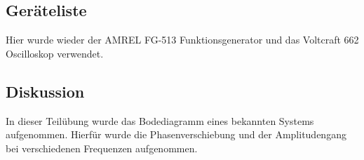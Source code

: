 \documentclass[12pt,a4paper,ngerman]{article}
\begin{document}
\subsection{Geräteliste}
Hier wurde wieder der AMREL FG-513 Funktionsgenerator und das Voltcraft 662 Oscilloskop verwendet.

\subsection{Diskussion}
In dieser Teilübung wurde das Bodediagramm eines bekannten Systems aufgenommen. Hierfür wurde die Phasenverschiebung und der Amplitudengang bei verschiedenen Frequenzen aufgenommen. 



 



   
\end{document}
